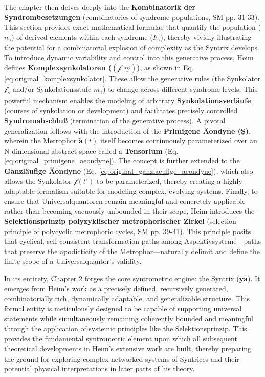 \documentclass[12pt]{article}
\newcommand{\syntrix}{\bm{y\widetilde{a}}}
\newcommand{\metrophor}{\bm{\widetilde{a}}}
\newcommand{\synkolator}{\mathcal{f}}
\newcommand{\synkolationsstufe}{m}
\newcommand{\syndrom}{F} %
\begin{document}
The chapter then delves deeply into the \textbf{Kombinatorik der Syndrombesetzungen} (combinatorics of syndrome populations, SM pp. 31-33). This section provides exact mathematical formulae that quantify the population (\( n_\gamma \)) of derived elements within each syndrome (\(\syndrom_\gamma\)), thereby vividly illustrating the potential for a combinatorial explosion of complexity as the Syntrix develops. To introduce dynamic variability and control into this generative process, Heim defines \textbf{Komplexsynkolatoren (\( (\underline{\synkolator}, \underline{\synkolationsstufe}) \))}, as shown in Eq. \eqref{eq:original_komplexsynkolator}. These allow the generative rules (the Synkolator \( \synkolator_\gamma \) and/or Synkolationsstufe \( \synkolationsstufe_\gamma \)) to change across different syndrome levels. This powerful mechanism enables the modeling of arbitrary \textbf{Synkolationsverläufe} (courses of synkolation or development) and facilitates precisely controlled \textbf{Syndromabschluß} (termination of the generative process). A pivotal generalization follows with the introduction of the \textbf{Primigene \"{A}ondyne (\(\underline{\bm{S}}\))}, wherein the Metrophor \( \metrophor(t) \) itself becomes continuously parameterized over an N-dimensional abstract space called a \textbf{Tensorium} (Eq. \eqref{eq:original_primigene_aeondyne}). The concept is further extended to the \textbf{Ganzläufige \"{A}ondyne} (Eq. \eqref{eq:original_ganzlaeufige_aeondyne}), which also allows the Synkolator \( \synkolator(t') \) to be parameterized, thereby creating a highly adaptable formalism suitable for modeling complex, evolving systems. Finally, to ensure that Universalquantoren remain meaningful and concretely applicable rather than becoming vacuously unbounded in their scope, Heim introduces the \textbf{Selektionsprinzip polyzyklischer metrophorischer Zirkel} (selection principle of polycyclic metrophoric cycles, SM pp. 39-41). This principle posits that cyclical, self-consistent transformation paths among Aspektivsysteme—paths that preserve the apodicticity of the Metrophor—naturally delimit and define the finite scope of a Universalquantor's validity.

In its entirety, Chapter 2 forges the core syntrometric engine: the Syntrix (\(\syntrix\)). It emerges from Heim's work as a precisely defined, recursively generated, combinatorially rich, dynamically adaptable, and generalizable structure. This formal entity is meticulously designed to be capable of supporting universal statements while simultaneously remaining coherently bounded and meaningful through the application of systemic principles like the Selektionsprinzip. This provides the fundamental syntrometric element upon which all subsequent theoretical developments in Heim's extensive work are built, thereby preparing the ground for exploring complex networked systems of Syntrices and their potential physical interpretations in later parts of his theory.
\end{document}
